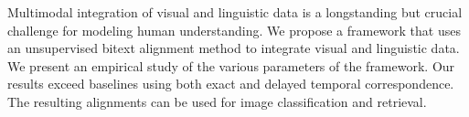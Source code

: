 Multimodal integration of visual and linguistic data is a longstanding but crucial challenge for modeling human understanding. We propose a framework that uses an unsupervised bitext alignment method to integrate visual and linguistic data. We present an empirical study of the various parameters of the framework. Our results exceed baselines using both exact and delayed temporal correspondence. The resulting alignments can be used for image classification and retrieval.
